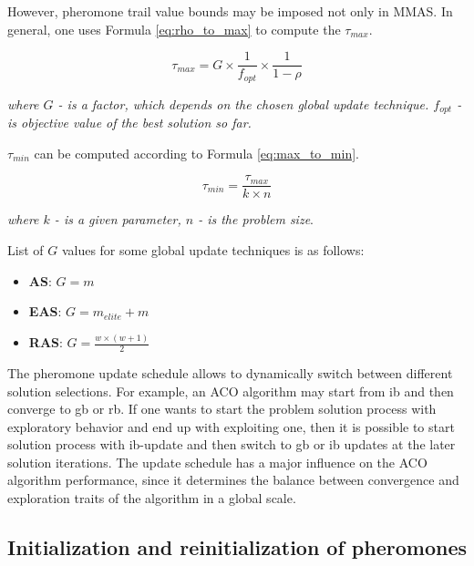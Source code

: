 \documentclass[12pt,a4paper,oneside]{book}
\begin{document}
However, pheromone trail value bounds may be imposed not only in MMAS. In general, one uses Formula \eqref{eq:rho_to_max} to compute the $\tau_{max}$.

\begin{equation}
\tau_{max} = G \times \frac{1}{f_{opt}} \times \frac{1}{1-\rho}
\label{eq:rho_to_max}
\end{equation}

\textit{where $G$ - is a factor, which depends on the chosen global update technique. $f_{opt}$ - is objective value of the best solution so far.}

$\tau_{min}$ can be computed according to Formula \eqref{eq:max_to_min}.

\begin{equation}
\tau_{min} = \frac{\tau_{max}} {k \times n} 
\label{eq:max_to_min}
\end{equation}

\textit{where $k$ - is a given parameter, $n$ -  is the problem size}.

List of $G$ values for some global update techniques is as follows:

\begin{itemize}
\item \textbf{AS}: $G = m$
\item \textbf{EAS}: $G = m_{elite} + m$
\item \textbf{RAS}: $G = \frac{w \times (w + 1)}{2}$
\end{itemize}

The pheromone update schedule allows to dynamically switch between different solution selections. For example, an ACO algorithm may start from ib and then converge to gb or rb. If one wants to start the problem solution process with exploratory behavior and end up with exploiting one, then it is possible to start solution process with ib-update and then switch to gb or ib updates at the later solution iterations. The update schedule has a major influence on the ACO algorithm performance, since it determines the balance between convergence and exploration traits of the algorithm in a global scale.



\subsection{Initialization and reinitialization of pheromones}
\end{document}
